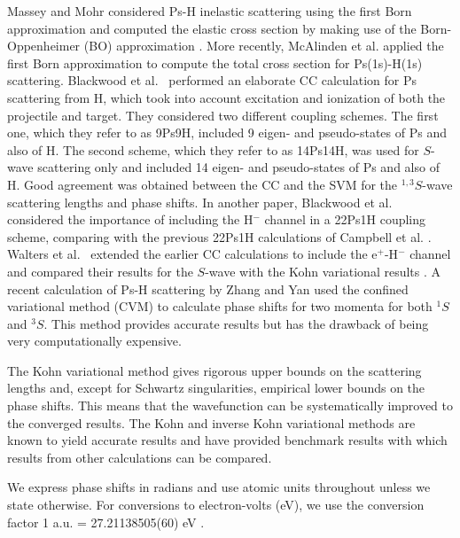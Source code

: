 \documentclass[preprint,showpacs,showkeys,preprintnumbers,amsmath,amssymb,longbibliography,pra,aps]{revtex4-1}
\begin{document}
Massey and Mohr \cite{Massey1954} considered Ps-H inelastic scattering using the first Born
approximation and computed the elastic cross section by making use of the
Born-Oppenheimer (BO) approximation
\cite{Massey1954,Oppenheimer1928,Geltman1969,Mott1965,Bransden2003,Bransden1970}.
More recently, McAlinden et al. \cite{McAlinden1996}
applied the first Born approximation to compute the total cross section for
Ps(1s)-H(1s) scattering.
Blackwood et al.~\cite{Blackwood2002} performed an elaborate CC calculation 
for Ps scattering from H, which took into account excitation and ionization 
of both the projectile and target. They considered two different coupling 
schemes. The first one, which they refer to as 9Ps9H, included 9 eigen- and 
pseudo-states of Ps and also of H. The second scheme, which they refer to as 
14Ps14H, was used for $S$-wave scattering only and included
14 eigen- and pseudo-states of 
Ps and also of H. Good agreement was obtained between the CC
\cite{Blackwood2002} and the SVM \cite{Ivanov2002} for the $^{1,3}S$-wave scattering
lengths and phase shifts. In another paper, Blackwood et
al.~\cite{Blackwood2002b} considered the importance of including the H$^-$
channel in a 22Ps1H coupling scheme, comparing with the previous 22Ps1H
calculations of Campbell et al. \cite{Campbell1998}. Walters et
al.~\cite{Walters2004} extended the earlier CC calculations
\cite{Blackwood2002} to include the e$^+$-H$^-$ channel
\cite{Blackwood2002b} and compared their results for the $S$-wave with the
Kohn variational results \cite{VanReeth2003}.
A recent calculation of Ps-H scattering by Zhang and Yan
\cite{Zhang2012} used the
confined variational method (CVM) to calculate phase shifts for two momenta
for both $^1S$ and $^3S$. This method provides accurate
results but has the drawback of being very computationally expensive.

The Kohn variational method gives rigorous upper bounds on the scattering lengths
and, except for Schwartz singularities, empirical lower bounds on the
phase shifts. This means that the wavefunction can be systematically improved
to the converged results. The Kohn and inverse Kohn
variational methods are known to yield accurate results and have provided 
benchmark results \cite{VanReeth2003,VanReeth2004} with which results from 
other calculations can be compared.

We express phase shifts in radians and use atomic units throughout unless
we state otherwise. For conversions to electron-volts (eV), we use the 
conversion factor 1 a.u. = {27.21138505(60) eV}
\cite{Mohr2012,*NISTConversions}.
\end{document}
